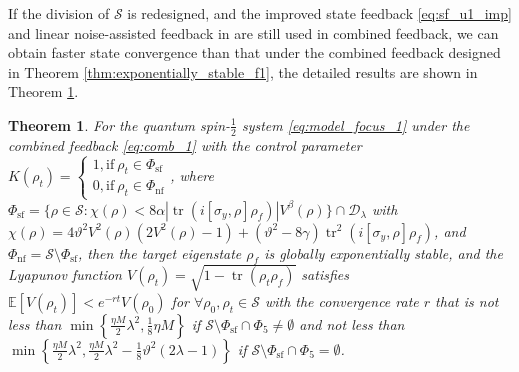 \documentclass[]{elsarticle}
\newtheorem{thm}{Theorem}
\begin{document}
If the division of $\mathcal{S}$ is redesigned, and the improved state feedback \eqref{eq:sf_u1_imp} and linear noise-assisted feedback in \cite{WSJZJ2021} are still used in combined feedback, we can obtain faster state convergence than that under the combined feedback designed in Theorem \ref{thm:exponentially_stable_f1}, the detailed results are shown in Theorem \ref{thm:exponentially_stable_csfimp_redesignS}.
\begin{thm}\label{thm:exponentially_stable_csfimp_redesignS}
	For the quantum spin-$\frac{1}{2}$ system \eqref{eq:model_focus_1} under the combined feedback \eqref{eq:comb_1} with the control parameter
	$K\left(\rho_t\right)=\left\{ \begin{array}{l}1, \text{if}~\rho_t\in \Phi_{\mathrm{sf}}\\ 0, \text{if}~\rho_t\in \Phi_{\mathrm{nf}}\end{array} \right. $,
	where $\Phi_{\mathrm{sf}}=\{\rho\in \mathcal{S}:\chi\left(\rho\right)<8\alpha|\operatorname{tr}\left(i\left[\sigma_{y}, \rho\right] {\rho_f}\right)| V^{\beta}\left(\rho\right)\}\cap \mathcal{D}_\lambda$ with $\chi\left(\rho\right)=4\vartheta^2V^2\left(\rho\right)\left(2V^2\left(\rho\right)-1\right)+\left(\vartheta^2-8\gamma \right)\operatorname{tr}^2\left(i\left[\sigma_y, \rho\right]\rho_{f}\right)$, and $\Phi_{\mathrm{nf}}=\mathcal{S}\setminus\Phi_{\mathrm{sf}}$, then the target eigenstate $\rho_f$ is globally exponentially stable, and the Lyapunov function $V(\rho_{t})=\sqrt{1-\operatorname{tr}\left(\rho_t\rho_f\right)}$ satisfies $\mathbb{E}\left[V\left(\rho_{t}\right)\right]<e^{-rt} V\left(\rho_{0}\right)$ for $\forall \rho_0, \rho_{t}\in \mathcal{S}$ with the convergence rate $r$ that is not less than $\min\left\{\frac{{\eta M}}{2}\lambda^{2}, \frac{1}{8}\eta M\right\}$ if $\mathcal{S}\setminus \Phi_{\mathrm{sf}}\cap\Phi_5\neq\emptyset$ and not less than $\min\left\{\frac{{\eta M}}{2}\lambda^{2}, \frac{{\eta M}}{2}\lambda^{2}-\frac{1}{8}\vartheta^2\left(2\lambda-1\right)\right\}$ if $\mathcal{S}\setminus \Phi_{\mathrm{sf}}\cap\Phi_5=\emptyset$. 
\end{thm}
\end{document}

